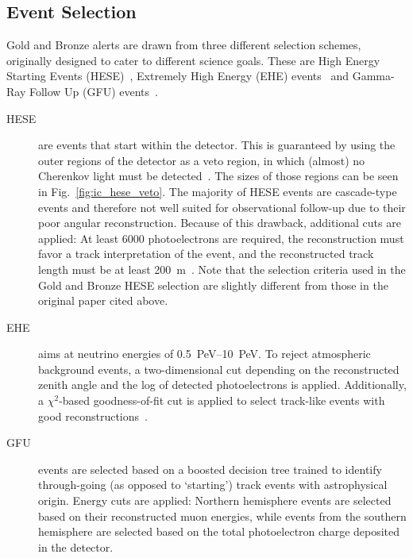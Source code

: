 \subsection{Event Selection}\label{ic_event_selection}

Gold and Bronze alerts are drawn from three different selection schemes, originally designed to cater to different science goals. These are High Energy Starting Events (HESE)~, Extremely High Energy (EHE) events~ and Gamma-Ray Follow Up (GFU) events~.

\begin{description}

    \item[HESE] are events that start within the detector. This is guaranteed by using the outer regions of the detector as a veto region, in which (almost) no Cherenkov light must be detected~\cite{Aartsen2013}. The sizes of those regions can be seen in Fig.~\ref{fig:ic_hese_veto}. The majority of HESE events are cascade-type events and therefore not well suited for observational follow-up due to their poor angular reconstruction. Because of this drawback, additional cuts are applied: At least 6000 photoelectrons are required, the reconstruction must favor a track interpretation of the event, and the reconstructed track length must be at least \SI{200}{\meter}~\cite{Abbasi2023}. Note that the selection criteria used in the Gold and Bronze HESE selection are slightly different from those in the original paper cited above.

    \item[EHE] aims at neutrino energies of \SIrange{0.5}{10}{\peta\eV}. To reject atmospheric background events, a two-dimensional cut depending on the reconstructed zenith angle and the log of detected photoelectrons is applied. Additionally, a $\chi^2$-based goodness-of-fit cut is applied to select track-like events with good reconstructions~\cite{Abbasi2023}.

    \item[GFU] events are selected based on a boosted decision tree trained to identify through-going (as opposed to `starting') track events with astrophysical origin. Energy cuts are applied: Northern hemisphere events are selected based on their reconstructed muon energies, while events from the southern hemisphere are selected based on the total photoelectron charge deposited in the detector.
\end{description}


